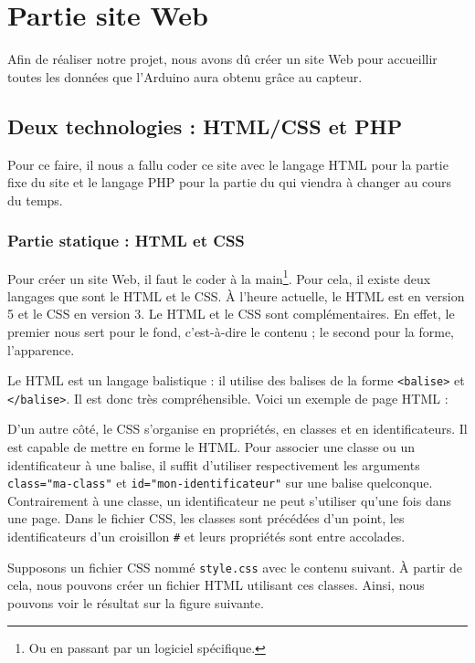 \chapter{Partie site Web}

Afin de réaliser notre projet, nous avons dû créer un site Web pour accueillir toutes les données que l'Arduino aura obtenu grâce au capteur.

\section{Deux technologies : HTML/CSS et PHP}

Pour ce faire, il nous a fallu coder ce site avec le langage HTML pour la partie fixe du site et le langage PHP pour la partie du qui viendra à changer au cours du temps.

\subsection{Partie statique : HTML et CSS}

Pour créer un site Web, il faut le coder à la main\footnote{Ou en passant par un logiciel spécifique.}. Pour cela, il existe deux langages que sont le HTML et le CSS. À l'heure actuelle, le HTML est en version 5 et le CSS en version 3. Le HTML et le CSS sont complémentaires. En effet, le premier nous sert pour le fond, c'est-à-dire le contenu ; le second pour la forme, l'apparence.

Le HTML est un langage balistique : il utilise des balises de la forme \verb-<balise>- et \verb-</balise>-. Il est donc très compréhensible. Voici un exemple de page HTML :

\Espace

D'un autre côté, le CSS s'organise en propriétés, en classes et en identificateurs. Il est capable de mettre en forme le HTML. Pour associer une classe ou un identificateur à une balise, il suffit d'utiliser respectivement les arguments \verb/class="ma-class"/ et \verb/id="mon-identificateur"/ sur une balise quelconque. Contrairement à une classe, un identificateur ne peut s'utiliser qu'une fois dans une page. Dans le fichier CSS, les classes sont précédées d'un point, les identificateurs d'un croisillon \verb-#- et leurs propriétés sont entre accolades.

Supposons un fichier CSS nommé \verb-style.css- avec le contenu suivant.
À partir de cela, nous pouvons créer un fichier HTML utilisant ces classes.
Ainsi, nous pouvons voir le résultat sur la figure suivante.

